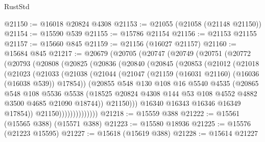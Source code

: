 \begin{lexlean}{RustStd}
\begin{coremodule}
@21150 := @16018 @20824 @4308
@21153 := @21055 (@21058 (@21148 @21150))
@21154 := @15590 @539
@21155 := @15786 @21154
@21156 := @21153 @21155
@21157 := @15660 @845
@21159 := @21156 (@16027 @21157)
@21160 := @15684 @845
@21217 := @20679
    (@20705
      (@20747
        (@20749
          (@20751
            (@20772
              (@20793
                (@20808
                  (@20825
                    (@20836
                      (@20840
                        (@20845
                          (@20853
                            (@21012
                              (@21018
                                (@21023
                                  (@21033
                                    (@21038
                                      (@21044
                                        (@21047
                                          (@21159 (@16031 @21160) (@16036 (@16038 @539)) @17854))
                                        (@20855
                                          @548
                                          @130
                                          @108
                                          @16
                                          @5540
                                          @4535
                                          (@20865
                                            @548
                                            @108
                                            @5536
                                            @5538
                                            (@18525
                                              @20824
                                              @4308
                                              @144
                                              @53
                                              @108
                                              @4552
                                              @4882
                                              @3500
                                              @4685
                                              @21090
                                              @18744))
                                          @21150)))
                                    @16340
                                    @16343
                                    @16346
                                    @16349
                                    @17854))
                                @21150))))))))))))))
@21218 := @15559 @388
@21222 := @15561 (@15565 @388) (@15571 @388)
@21223 := @15580 @18936
@21225 := @15576 (@21223 @15595)
@21227 := @15618 (@15619 @388)
@21228 := @15614 @21227

\end{coremodule}
\end{lexlean}
